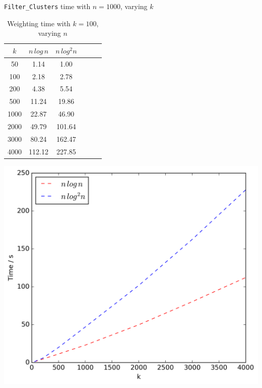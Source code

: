 \documentclass[12pt,a4paper]{article}
\begin{document}
\begin{table}[!ht]
        \begin{minipage}{0.48\textwidth}
            \centering
            \caption[Runtime of \texttt{Filter\_Clusters} in Scenario 2, with $n = 1000$ and varying $k$]{\texttt{Filter\_Clusters} time with $n = 1000$, varying $k$}
            \label{tab:filterk2}
            \begin{tabular}{c||ccccc}
                $k$ & $n\,log\,n$ & $n\,log^2n$\\
                \hline\hline
                50 & 1.14 & 1.00\\
                100 & 2.18 & 2.78\\
                200 & 4.38 & 5.54\\
                500 & 11.24 & 19.86\\
                1000 & 22.87 & 46.90\\
                2000 & 49.79 & 101.64\\
                3000 & 80.24 & 162.47\\
                4000 & 112.12 & 227.85\\
            \end{tabular}
            \includegraphics[scale=0.4]{varyingk2_filter}
            \vspace{0.5cm}
        \end{minipage}
        \begin{minipage}{0.48\textwidth}
            \centering
            \caption[Runtime of the Weighting step in Scenario 2, with $k = 100$ and varying $n$]{Weighting time with $k = 100$, varying $n$}

\end{minipage}
\end{table}
\end{document}
